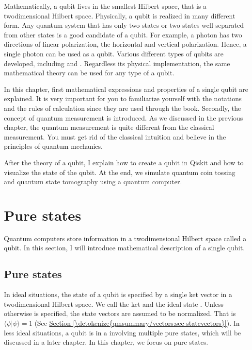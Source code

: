 \documentclass[letterpaper,10pt,english]{jupyterBook}
\begin{document}
\sphinxAtStartPar
Mathematically, a qubit lives in the smallest Hilbert space, that is a two\sphinxhyphen{}dimensional Hilbert space. Physically, a qubit is realized in many different form.  Any quantum system that has only two states or two states well separated from other states is a good candidate of a qubit.    For example, a photon  has two directions of linear polarization,  the horizontal and vertical polarization.  Hence, a single photon can be used as a qubit.  Various different types of qubits are developed, including  and .  Regardless its physical implementation, the same mathematical theory can be used for any type of a qubit.

\sphinxAtStartPar
In this chapter, first mathematical expressions and properties of a single qubit are explained. It is very important for you to familiarize yourself with the notations and the rules of calculation since they are used through the book.  Secondly, the concept of quantum measurement is introduced.  As we discussed in the previous chapter, the quantum measurement is quite different from the classical measurement.  You must get rid of the classical intuition and believe in the principles of quantum mechanics.

\sphinxAtStartPar
After the theory of a qubit, I explain how to create a qubit in Qiskit and how to visualize the state of the qubit.  At the end, we simulate quantum coin tossing and quantum state tomography using a quantum computer.

\sphinxstepscope


\section{Pure states}
\label{\detokenize{qubit/purestates:pure-states}}\label{\detokenize{qubit/purestates:sec-purestates}}\label{\detokenize{qubit/purestates::doc}}
\sphinxAtStartPar
Quantum computers store information in a two\sphinxhyphen{}dimensional Hilbert space called a qubit.   In this section, I will introduce mathematical description of a single qubit.


\subsection{Pure states}
\label{\detokenize{qubit/purestates:id1}}
\sphinxAtStartPar
In ideal situations, the state of a qubit is specified by a single ket vector in a two\sphinxhyphen{}dimensional Hilbert space.  We call the ket  and the ideal state .  Unless otherwise is specified, the state vectors are assumed to be normalized. That is \(\langle \psi | \psi \rangle = 1\) (See \hyperref[\detokenize{qmsummary/vectors:sec-statevectors}]{Section \ref{\detokenize{qmsummary/vectors:sec-statevectors}}}).
In less ideal situations, a qubit is in a  involving multiple pure states, which will be discussed in a later chapter.  In this chapter, we focus on pure states.
\end{document}
